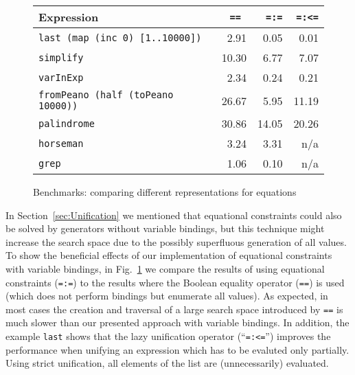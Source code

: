 \documentclass{llncs}
\newcommand{\code}[1]{\mbox{\small\texttt{#1}}}
\newcommand{\ccode}[1]{``\code{#1}''}
\begin{document}
\begin{figure}[t]
\centering
\begin{tabular}{|l|r|r|r|}
\hline
Expression                              & \code{==~}& \code{=:=}& \code{=:<=} \\
\hline
\code{last (map (inc 0) [1..10000])}   &  2.91   &    0.05   &    0.01   \\
\code{simplify}                         & 10.30      & 6.77      & 7.07        \\
\code{varInExp}                         & 2.34    & 0.24      & 0.21        \\
\code{fromPeano (half (toPeano 10000))} & 26.67     & 5.95      & 11.19       \\
\code{palindrome}                       & 30.86     & 14.05     & 20.26       \\
\code{horseman}                         & 3.24      & 3.31      & n/a         \\
\code{grep}                             & 1.06      & 0.10      & n/a         \\
\hline
\end{tabular}
\caption{Benchmarks: comparing different representations for equations}
 \label{fig:search-strategies}
\end{figure}

In Section~\ref{sec:Unification} we mentioned that equational
constraints could also be solved by generators without variable bindings,
but this technique might increase the search space due to the
possibly superfluous generation of all values.
To show the beneficial effects of our implementation
of equational constraints with variable bindings,
in Fig.~\ref{fig:search-strategies} we compare
the results of using equational constraints (\code{=:=})
to the results
where the Boolean equality operator (\code{==}) is used (which
does not perform bindings but enumerate all values).
As expected, in most cases the creation and traversal of a large
search space introduced by \code{==} is much slower than our
presented approach with variable bindings.
In addition, the example \code{last} shows that the lazy 
unification operator (\ccode{=:<=}) improves the performance when unifying an
expression which has to be evaluted only partially. Using strict unification,
all elements of the list are (unnecessarily) evaluated.
\end{document}
